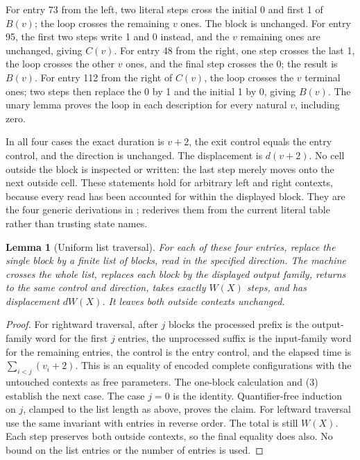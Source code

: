 \documentclass[11pt]{article}
\newtheorem{lemma}[theorem]{Lemma}
\begin{document}
For entry 73 from the left, two literal steps cross the initial 0 and
first 1 of $B(v)$; the loop crosses the remaining $v$ ones.  The block is
unchanged.  For entry 95, the first two steps write 1 and 0 instead, and
the $v$ remaining ones are unchanged, giving $C(v)$.  For entry 48 from
the right, one step crosses the last 1, the loop crosses the other $v$
ones, and the final step crosses the 0; the result is $B(v)$.  For entry
112 from the right of $C(v)$, the loop crosses the $v$ terminal ones;
two steps then replace the 0 by 1 and the initial 1 by 0, giving $B(v)$.
The unary lemma proves the loop in each description for every natural
$v$, including zero.

In all four cases the exact duration is $v+2$, the exit control equals
the entry control, and the direction is unchanged.  The displacement is
$d(v+2)$.  No cell outside the block is inspected or written: the last
step merely moves onto the next outside cell.  These statements hold for
arbitrary left and right contexts, because every read has been accounted
for within the displayed block.  They are the four generic derivations
in ;  rederives them
from the current literal table rather than trusting state names.

\begin{lemma}[Uniform list traversal]
For each of these four entries, replace the single block by a finite list
of blocks, read in the specified direction.  The machine crosses the
whole list, replaces each block by the displayed output family, returns
to the same control and direction, takes exactly $W(X)$ steps, and has
displacement $dW(X)$.  It leaves both outside contexts unchanged.
\end{lemma}

\begin{proof}
For rightward traversal, after $j$ blocks the processed prefix is the
output-family word for the first $j$ entries, the unprocessed suffix is
the input-family word for the remaining entries, the control is the
entry control, and the elapsed time is
$\sum_{i<j}(v_i+2)$.  This is an equality of encoded complete
configurations with the untouched contexts as free parameters.  The
one-block calculation and (3) establish the next case.  The case $j=0$
is the identity.  Quantifier-free induction on $j$, clamped to the list
length as above, proves the claim.  For leftward traversal use the same
invariant with entries in reverse order.  The total is still $W(X)$.
Each step preserves both outside contexts, so the final equality does
also.  No bound on the list entries or the number of entries is used.
\end{proof}
\end{document}
